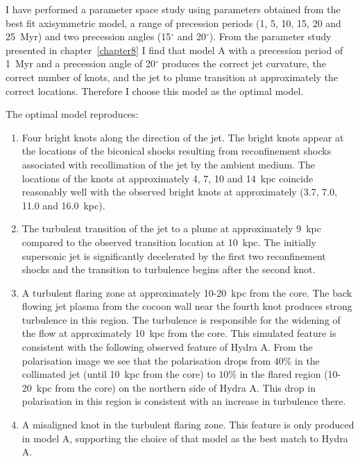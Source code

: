 
I have performed a parameter space study using parameters obtained from the best fit axisymmetric model, a range of precession periods (1, 5, 10, 15, 20 and 25~Myr) and two precession angles (15$^{\circ}$ and 20$^{\circ}$). From the parameter study presented in chapter~\ref{chapter8} I find that model A with a precession period of 1~Myr and a precession angle of 20$^{\circ}$ produces the correct jet curvature, the correct number of knots, and the jet to plume transition at approximately the correct locations. Therefore I choose this model as the optimal model. 

The optimal model reproduces:
\begin{enumerate}
\item Four bright knots along the direction of the jet. The bright knots appear at the locations of the biconical shocks resulting from reconfinement shocks associated with recollimation of the jet by the ambient medium. The locations of the knots at approximately 4, 7, 10 and 14~kpc coincide reasonably well with the observed bright knots at approximately (3.7, 7.0, 11.0 and 16.0~kpc). 
\item The turbulent transition of the jet to a plume at approximately $9$~kpc compared to the observed transition location at 10~kpc. The initially supersonic jet is significantly decelerated by the first two reconfinement shocks and the transition to turbulence begins after the second knot.  
\item A turbulent flaring zone at approximately 10-20~kpc from the core. The back flowing jet plasma from the cocoon wall near the fourth knot produces strong turbulence in this region. The turbulence is responsible for the widening of the flow at approximately 10~kpc from the core. This simulated feature is consistent with the following observed feature of Hydra A. From the polarisation image \citep{taylor90} we see that the polarisation drops from $40\%$ in the collimated jet (until 10~kpc from the core) to $10\%$ in the flared region (10-20~kpc from the core) on the northern side of Hydra A. This drop in polarisation in this region is consistent with an increase in turbulence there.
\item A misaligned knot in the turbulent flaring zone. This feature is only produced in model A, supporting the choice of that model as the best match to Hydra A. 
\end{enumerate}

